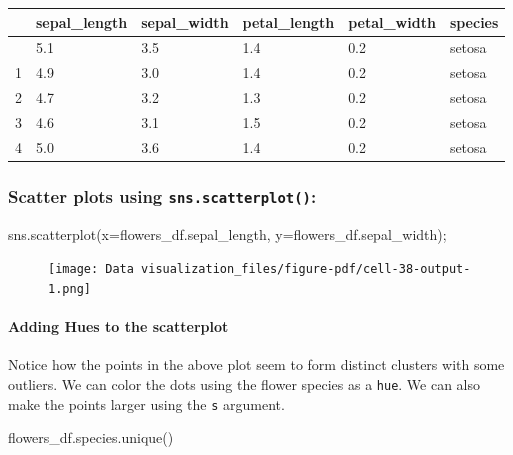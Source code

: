 \documentclass[
  letterpaper,
  DIV=11,
  numbers=noendperiod]{scrreprt}
\let\oldparagraph\paragraph
\renewcommand{\paragraph}[1]{\oldparagraph{#1}\mbox{}}
\newenvironment{Shaded}{\begin{snugshade}}{\end{snugshade}}
\newcommand{\NormalTok}[1]{\textcolor[rgb]{0.00,0.23,0.31}{#1}}
\newcommand{\OperatorTok}[1]{\textcolor[rgb]{0.37,0.37,0.37}{#1}}
\begin{document}
\begin{longtable}[]{@{}llllll@{}}
\toprule\noalign{}
& sepal\_length & sepal\_width & petal\_length & petal\_width &
species \\
\midrule\noalign{}
\endhead
\bottomrule\noalign{}
\endlastfoot
0 & 5.1 & 3.5 & 1.4 & 0.2 & setosa \\
1 & 4.9 & 3.0 & 1.4 & 0.2 & setosa \\
2 & 4.7 & 3.2 & 1.3 & 0.2 & setosa \\
3 & 4.6 & 3.1 & 1.5 & 0.2 & setosa \\
4 & 5.0 & 3.6 & 1.4 & 0.2 & setosa \\
\end{longtable}

\hypertarget{scatter-plots-using-sns.scatterplot}{%
\subsubsection{\texorpdfstring{Scatter plots using
\texttt{sns.scatterplot()}:}{Scatter plots using sns.scatterplot():}}\label{scatter-plots-using-sns.scatterplot}}

\begin{Shaded}
\begin{Highlighting}[]
\NormalTok{sns.scatterplot(x}\OperatorTok{=}\NormalTok{flowers\_df.sepal\_length, y}\OperatorTok{=}\NormalTok{flowers\_df.sepal\_width)}\OperatorTok{;}
\end{Highlighting}
\end{Shaded}

\begin{figure}[H]

{\centering \texttt{[image: Data visualization\_files/figure-pdf/cell-38-output-1.png]}

}

\end{figure}

\hypertarget{adding-hues-to-the-scatterplot}{%
\paragraph{Adding Hues to the
scatterplot}\label{adding-hues-to-the-scatterplot}}

Notice how the points in the above plot seem to form distinct clusters
with some outliers. We can color the dots using the flower species as a
\texttt{hue}. We can also make the points larger using the \texttt{s}
argument.

\begin{Shaded}
\begin{Highlighting}[]
\NormalTok{flowers\_df.species.unique()}
\end{Highlighting}
\end{Shaded}
\end{document}
